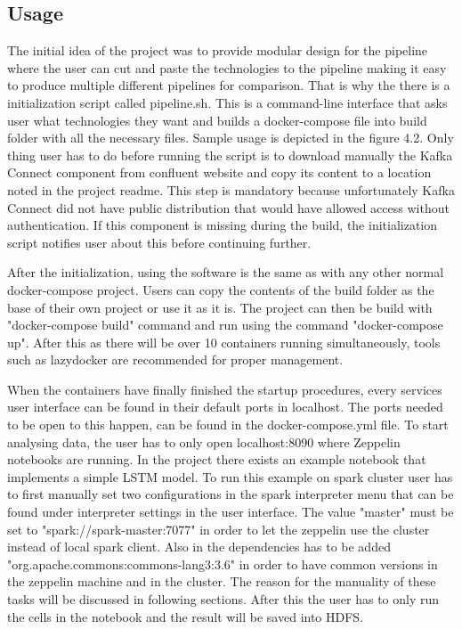 \subsection{Usage}

The initial idea of the project was to provide modular design for the pipeline where the user can cut and paste the technologies to the pipeline making it easy to produce multiple different pipelines for comparison.
That is why the there is a initialization script called pipeline.sh.
This is a command-line interface that asks user what technologies they want and builds a docker-compose file into build folder with all the necessary files.
Sample usage is depicted in the figure 4.2.
Only thing user has to do before running the script is to download manually the Kafka Connect component from confluent website and copy its content to a location noted in the project readme. 
This step is mandatory because unfortunately Kafka Connect did not have public distribution that would have allowed access without authentication.
If this component is missing during the build, the initialization script notifies user about this before continuing further.

After the initialization, using the software is the same as with any other normal docker-compose project.
Users can copy the contents of the build folder as the base of their own project or use it as it is.
The project can then be build with "docker-compose build" command and run using the command "docker-compose up".
After this as there will be over 10 containers running simultaneously, tools such as lazydocker are recommended for proper management.

When the containers have finally finished the startup procedures, every services user interface can be found in their default ports in localhost.
The ports needed to be open to this happen, can be found in the docker-compose.yml file.
To start analysing data, the user has to only open localhost:8090 where Zeppelin notebooks are running.
In the project there exists an example notebook that implements a simple LSTM model.
To run this example on spark cluster user has to first manually set two configurations in the spark interpreter menu that can be found under interpreter settings in the user interface.
The value "master" must be set to "spark://spark-master:7077" in order to let the zeppelin use the cluster instead of local spark client.
Also in the dependencies has to be added "org.apache.commons:commons-lang3:3.6" in order to have common versions in the zeppelin machine and in the cluster.
The reason for the manuality of these tasks will be discussed in following sections.
After this the user has to only run the cells in the notebook and the result will be saved into HDFS.

